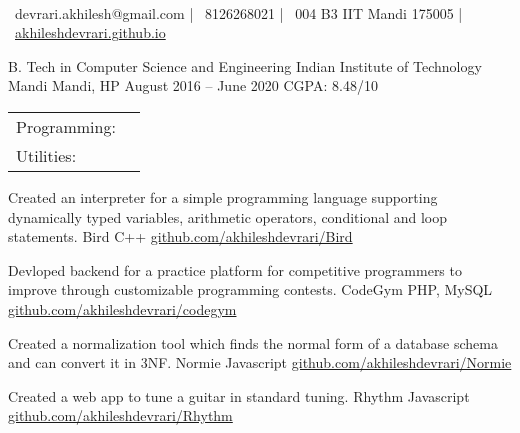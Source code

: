 \documentclass[]{awesome-cv}
\begin{document}
    
\begin{center}
	  \\
	\vspace{2mm}
	{\faEnvelope\ devrari.akhilesh@gmail.com} | {\faMobile\ 8126268021} | {\faMapMarker\ 004 B3 IIT Mandi 175005} | {\faLink\ \href{https://akhileshdevrari.github.io/}{akhileshdevrari.github.io}}
\end{center}
\begin{cventries}
	\cventry
	{B. Tech in Computer Science and Engineering}
	{Indian Institute of Technology Mandi}
	{Mandi, HP}
	{August 2016 – June 2020}
	{CGPA: 8.48/10}
\end{cventries}


\begin{cventries}
	\vspace{-4mm}
	\cventry
	{}
	{\def\arraystretch{1.15}{\begin{tabular}{ l l }
		Programming:  & {\skill{ Comfortable: C/C++, Javascript \hspace{1cm} Less experience: PHP, Python}} \\
		Utilities:  & {\skill{ MySQL, Git, Linux shell utilities}} \\
		\end{tabular}}}
	{}
	{}
	{}
\end{cventries}

\vspace{-7mm}
\begin{cventries}
	\cventry
	{Created an interpreter for a simple programming language supporting dynamically typed variables, arithmetic operators, conditional and loop statements.}
	{Bird}
	{C++}
	{\href{https://github.com/akhileshdevrari/Bird}{github.com/akhileshdevrari/Bird}}
	{}
	
	\vspace{-5mm}
	\cventry
	{Devloped backend for a practice platform for competitive programmers to improve through customizable programming contests.}
	{CodeGym}
	{PHP, MySQL}
	{\href{https://github.com/akhileshdevrari/codegym}{github.com/akhileshdevrari/codegym}}
	{}
	
	
	\vspace{-5mm}
	\cventry
	{Created a normalization tool which finds the normal form of a database schema and can convert it in 3NF.}
	{Normie}
	{Javascript}
	{\href{https://github.com/akhileshdevrari/Normie}{github.com/akhileshdevrari/Normie}}
	{}
	
	\vspace{-5mm}
	\cventry
	{Created a web app to tune a guitar in standard tuning.}
	{Rhythm}
	{Javascript}
	{\href{https://github.com/akhileshdevrari/Rhythm}{github.com/akhileshdevrari/Rhythm}}
	{}
	
\end{cventries}
\end{document}
